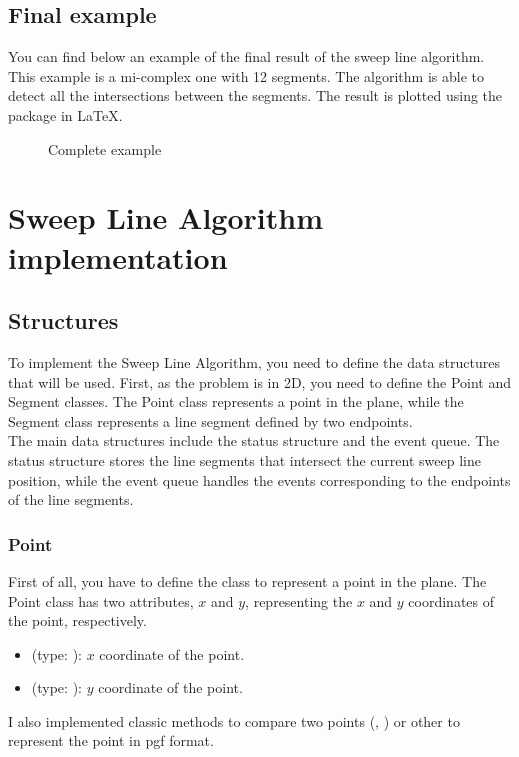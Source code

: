 \documentclass[10pt,a4paper,hidelinks]{article}
\begin{document}
\subsection{Final example}
You can find below an example of the final result of the sweep line algorithm. This example is a mi-complex one with 12 segments. The algorithm is able to detect all the intersections between the segments. The result is plotted using the  package in \LaTeX.
\begin{figure}[h]
    \centering
    
    \caption{Complete example}
\end{figure}

\section{Sweep Line Algorithm implementation}
\subsection{Structures}
To implement the Sweep Line Algorithm, you need to define the data structures that will be used. First, as the problem is in 2D, you need to define the Point and Segment classes. The Point class represents a point in the plane, while the Segment class represents a line segment defined by two endpoints.\\

The main data structures include the status structure and the event queue. The status structure stores the line segments that intersect the current sweep line position, while the event queue handles the events corresponding to the endpoints of the line segments.

\subsubsection{Point}
First of all, you have to define the  class to represent a point in the plane. The Point class has two attributes, $x$ and $y$, representing the $x$ and $y$ coordinates of the point, respectively.
\begin{itemize}
    \item {} (type: ): $x$ coordinate of the point.
    \item {} (type: ): $y$ coordinate of the point.
\end{itemize}

I also implemented classic methods to compare two points (, ) or other to represent the point in pgf format.
\end{document}
